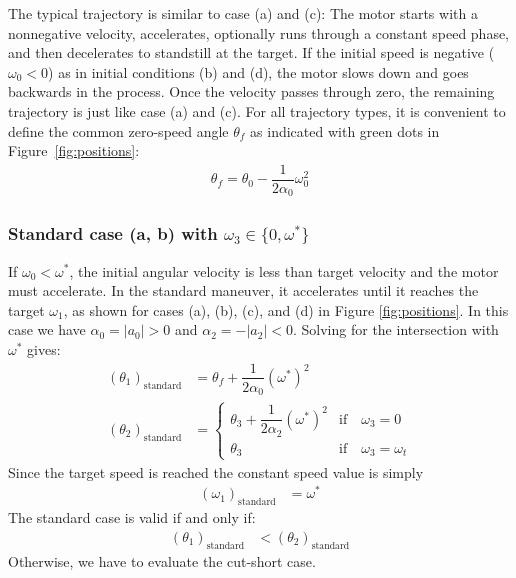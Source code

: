 \documentclass[12pt, a4paper]
{article}
\providecommand{\lr}[1]{\left(#1\right)}
\providecommand{\sub}[1]{_{\text{#1}}}
\providecommand{\w}{\omega}
\providecommand{\wt}{\w^*}
\renewcommand{\th}{\theta}
\renewcommand{\a}{\alpha}
\providecommand{\abs}[1]{\left|#1\right|}
\begin{document}
The typical trajectory is similar to case (a) and (c): The motor starts
with a nonnegative velocity, accelerates, optionally runs through a constant
speed phase, and then decelerates to standstill at the target.
If the initial speed is negative ($\w_0 < 0$) as in initial conditions (b)
and (d), the motor slows down and goes backwards in the process. Once the
velocity passes through zero, the remaining trajectory is just like case (a)
and (c). For all trajectory types, it is convenient to define the common
zero-speed angle $\th_f$ as indicated
with green dots in Figure~\ref{fig:positions}:
%
\begin{align}
    \th_f = \th_0 - \dfrac{1}{2 \a_0}\w_0^2
\end{align}



\subsubsection{Standard case (a, b) with $\w_3 \in \{0, \wt\}$}
\label{sec:a:standard}
If $\w_0 < \wt$, the initial angular velocity is less than target velocity and
the motor must accelerate. In the standard maneuver, it accelerates
until it reaches the target $\w_1$, as shown for cases (a), (b), (c), and (d)
in Figure \ref{fig:positions}. In this case we have $\a_0 = \abs{a_0} > 0$
and $\a_2 = -\abs{a_2} < 0$. Solving for the intersection with $\wt$ gives:
%
\begin{align}
    \label{eq:a:t1mt0:standard}
    \lr{\th_1}\sub{standard} &= \th_f  + \dfrac{1}{2\a_0}(\wt)^2\\[1em]
    \lr{\th_2}\sub{standard} &=
        \begin{cases}
        \th_3  + \dfrac{1}{2\a_2}(\wt)^2 & \text{if} \quad \w_3 = 0\\ 
        \th_3 &  \text{if} \quad\w_3 = \w_t
        \end{cases}
\end{align}
%
%
Since the target speed is reached the constant speed value is simply
\begin{align}
    \lr{\w_1}\sub{standard} &= \wt
\end{align}
%
The standard case is valid if and only if:
\begin{align}
    \label{eq:a:t1mt0:standardvalidity}
    \lr{\th_1}\sub{standard} &< \lr{\th_2}\sub{standard}
\end{align}
%
Otherwise, we have to evaluate the cut-short case.
%
\end{document}
